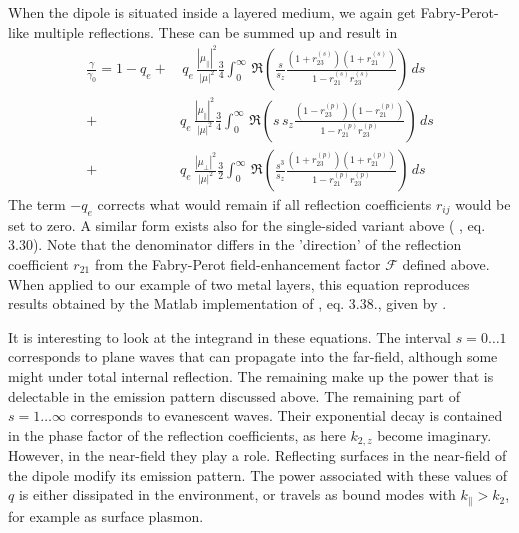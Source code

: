 When the dipole is situated inside a layered medium, we again get Fabry-Perot-like multiple reflections. These can be summed up and result in
\begin{align} 
\frac{\gamma}{\gamma_0} = 1 - q_e + & \, q_e \, \frac{| \mu_\parallel|^2}{|\mu|^2} \frac{3}{4}
\int_0^\infty \, \Re \left( 
\frac{s}{s_z} \frac{(1 + r_{23}^{(s)} ) (1 +  r_{21}^{(s)} ) }{1 -  r_{21}^{(s)}  r_{23}^{(s)} } 
\right) \, ds \label{eq:decay_double} \\
+ &q_e \, \frac{| \mu_\parallel|^2}{|\mu|^2} \frac{3}{4}
\int_0^\infty \, \Re  \left( 
s \, s_z \frac{(1 - r_{23}^{(p)} ) (1 -  r_{21}^{(p)} ) }{1 -  r_{21}^{(p)}  r_{23}^{(p)} } 
\right) \, ds \nonumber \\
+ & q_e \,\frac{| \mu_\perp|^2}{|\mu|^2} \frac{3}{2}
\int_0^\infty \, \Re \left( 
\frac{s^3}{s_z} \frac{(1 + r_{23}^{(p)} ) (1 +  r_{21}^{(p)} ) }{1 -  r_{21}^{(p)}  r_{23}^{(p)} } 
\right) \, ds  \nonumber  
\end{align}
The term $-q_e$ corrects what would remain if all reflection coefficients $r_{ij}$ would be set to zero. A similar form exists also for the single-sided variant above
(\cite{Ford_Weber_84} , eq. 3.30). Note that the denominator differs in the 'direction' of the reflection coefficient $r_{21}$ from the Fabry-Perot field-enhancement factor $\mathcal{F}$ defined above. When applied to our example of two metal layers, this equation reproduces results obtained by the Matlab implementation of \cite{Ford_Weber_84}, eq. 3.38., given by \cite{Jun10_thesis}.


It is interesting to look at the integrand in these equations. The interval $s = 0 \dots 1$ corresponds to plane waves that can propagate into the far-field, although some might under total internal reflection. The remaining make up the power that is delectable in the emission pattern discussed above. The remaining part of $s = 1 \dots \infty$ corresponds to evanescent waves. Their exponential decay is contained in the phase factor of the reflection coefficients, as here $k_{2,z}$ become imaginary. However, in the near-field they play a role. Reflecting surfaces in the near-field of the dipole modify its emission pattern. The power associated with these values of $q$ is either dissipated in the environment, or travels as bound modes with $k_\parallel > k_2$, for example as surface plasmon.

